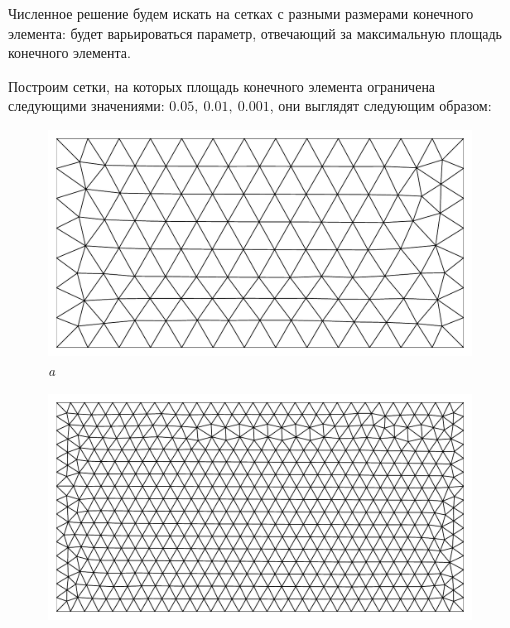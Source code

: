 \documentclass[12pt, a4paper]{article}
\begin{document}
				Численное решение будем искать на сетках с разными размерами конечного элемента: будет варьироваться параметр, отвечающий за максимальную площадь конечного элемента. 
				 				
				Построим сетки, на которых площадь конечного элемента ограничена следующими значениями: $0.05, \ 0.01, \ 0.001$, они выглядят следующим образом: 
				
				\newpage
									
				\begin{figure}[h]       
					\vspace{-0.0mm} 
					\begin{center} 
						{ 
							\begin{minipage}{0.45\textwidth} 
								\centering 
								\includegraphics[width=1\columnwidth]{rect_dirichlet_only_005_calfem_net.pdf}\\ 
								\textit{a} 
							\end{minipage}                                 
						} 
						{ 
							\begin{minipage}{0.45\textwidth} 
								\centering 
								\includegraphics[width=1\columnwidth]{rect_dirichlet_only_001_calfem_net.pdf}\\ 

\end{minipage}}
\end{center}
\end{figure}
\end{document}
